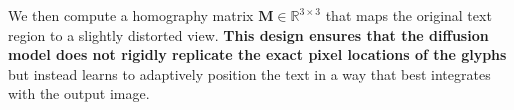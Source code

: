 \begin{comment}
Using the original corner points of the bounding box
\begin{equation}
\left\{ (x_i, y_i)\ \text{for} \ i \ \in\{1,2,3,4\} \right\}
\end{equation}
and the randomly perturbed ones 
\begin{align}
& \left\{ (x_i + \delta x_i, y_i + \delta y_i)\ \text{for} \ i \ \in\{1,2,3,4\} \right\}, \\
& \text{ s.t. }\left|\delta x_i\right| \leq \epsilon \text{ and }\left|\delta y_i\right| \leq \epsilon,
\end{align}
\end{comment}

We then compute a homography matrix $\boldsymbol{M} \in \mathbb{R}^{3 \times 3}$ that maps the original text region to a slightly distorted view. \textbf{This design ensures that the diffusion model does not rigidly replicate the exact pixel locations of the glyphs} but instead learns to adaptively position the text in a way that best integrates with the output image.

